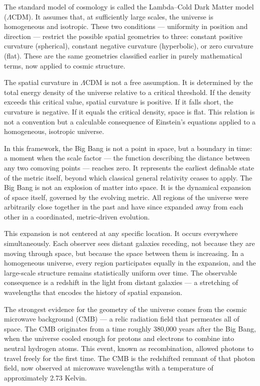 The standard model of cosmology is called the Lambda–Cold Dark Matter model ($\Lambda$CDM). It assumes that, at sufficiently large scales, the universe is homogeneous and isotropic. These two conditions — uniformity in position and direction — restrict the possible spatial geometries to three: constant positive curvature (spherical), constant negative curvature (hyperbolic), or zero curvature (flat). These are the same geometries classified earlier in purely mathematical terms, now applied to cosmic structure.

The spatial curvature in $\Lambda$CDM is not a free assumption. It is determined by the total energy density of the universe relative to a critical threshold. If the density exceeds this critical value, spatial curvature is positive. If it falls short, the curvature is negative. If it equals the critical density, space is flat. This relation is not a convention but a calculable consequence of Einstein’s equations applied to a homogeneous, isotropic universe.

In this framework, the Big Bang is not a point in space, but a boundary in time: a moment when the scale factor — the function describing the distance between any two comoving points — reaches zero. It represents the earliest definable state of the metric itself, beyond which classical general relativity ceases to apply. The Big Bang is not an explosion of matter into space. It is the dynamical expansion of space itself, governed by the evolving metric. All regions of the universe were arbitrarily close together in the past and have since expanded away from each other in a coordinated, metric-driven evolution.

This expansion is not centered at any specific location. It occurs everywhere simultaneously. Each observer sees distant galaxies receding, not because they are moving through space, but because the space between them is increasing. In a homogeneous universe, every region participates equally in the expansion, and the large-scale structure remains statistically uniform over time. The observable consequence is a redshift in the light from distant galaxies — a stretching of wavelengths that encodes the history of spatial expansion.

The strongest evidence for the geometry of the universe comes from the cosmic microwave background (CMB) — a relic radiation field that permeates all of space. The CMB originates from a time roughly 380,000 years after the Big Bang, when the universe cooled enough for protons and electrons to combine into neutral hydrogen atoms. This event, known as recombination, allowed photons to travel freely for the first time. The CMB is the redshifted remnant of that photon field, now observed at microwave wavelengths with a temperature of approximately 2.73 Kelvin.

